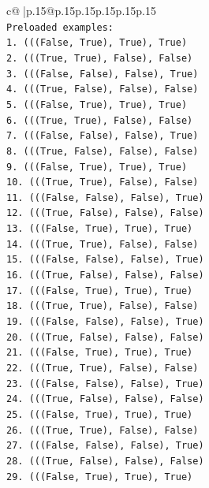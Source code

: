 \documentclass{article}
\begin{document}
{\begin{supertabular}{c@{$\;$}|p{.15\linewidth}@{}p{.15\linewidth}p{.15\linewidth}p{.15\linewidth}p{.15\linewidth}p{.15\linewidth}}
{{{\\ 
\texttt{Preloaded examples:} \\
\texttt{1. (((False, True), True), True)} \\
\texttt{2. (((True, True), False), False)} \\
\texttt{3. (((False, False), False), True)} \\
\texttt{4. (((True, False), False), False)} \\
\texttt{5. (((False, True), True), True)} \\
\texttt{6. (((True, True), False), False)} \\
\texttt{7. (((False, False), False), True)} \\
\texttt{8. (((True, False), False), False)} \\
\texttt{9. (((False, True), True), True)} \\
\texttt{10. (((True, True), False), False)} \\
\texttt{11. (((False, False), False), True)} \\
\texttt{12. (((True, False), False), False)} \\
\texttt{13. (((False, True), True), True)} \\
\texttt{14. (((True, True), False), False)} \\
\texttt{15. (((False, False), False), True)} \\
\texttt{16. (((True, False), False), False)} \\
\texttt{17. (((False, True), True), True)} \\
\texttt{18. (((True, True), False), False)} \\
\texttt{19. (((False, False), False), True)} \\
\texttt{20. (((True, False), False), False)} \\
\texttt{21. (((False, True), True), True)} \\
\texttt{22. (((True, True), False), False)} \\
\texttt{23. (((False, False), False), True)} \\
\texttt{24. (((True, False), False), False)} \\
\texttt{25. (((False, True), True), True)} \\
\texttt{26. (((True, True), False), False)} \\
\texttt{27. (((False, False), False), True)} \\
\texttt{28. (((True, False), False), False)} \\
\texttt{29. (((False, True), True), True)} \\
}}}
\end{supertabular}}
\end{document}
